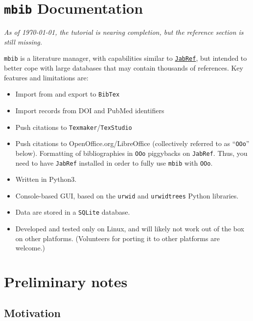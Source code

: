 \documentclass[10pt]{article}
\newcommand*{\mbib}{\texttt{mbib}\xspace}
\newcommand*{\jabref}{\texttt{JabRef}\xspace}
\newcommand*{\ooo}{\texttt{OOo}\xspace}
\newcommand*{\bibtex}{\texttt{BibTex}\xspace}
\newcommand*{\sqlite}{\texttt{SQLite}\xspace}
\begin{document}
\section*{\mbib Documentation}

\emph{As of \today, the tutorial is nearing completion, but the reference section is still missing.}

\bigskip

\noindent \mbib is a literature manager, with capabilities similar to \href{http://www.jabref.org}{\jabref}, but intended to better cope with large databases that may contain thousands of references.  Key features and limitations are:

\begin{itemize}
\item Import from and export to \bibtex  

\item Import records from DOI and PubMed identifiers

\item Push citations to \texttt{Texmaker}/\texttt{TexStudio}

\item Push citations to OpenOffice.org/LibreOffice (collectively referred to as ``\ooo'' below). Formatting of bibliographies in \ooo piggybacks on \jabref. Thus, you need to have \jabref installed in order to fully use \mbib with \ooo.

\item Written in Python3.

\item Console-based GUI, based on the \texttt{urwid} and
\texttt{urwidtrees} Python libraries. 

\item Data are stored in a \sqlite database.

\item Developed and tested only on Linux, and will likely not work out of the box on other platforms. (Volunteers for porting it to other platforms are welcome.)

\end{itemize}

\section{Preliminary notes}

\subsection{Motivation}
\end{document}
